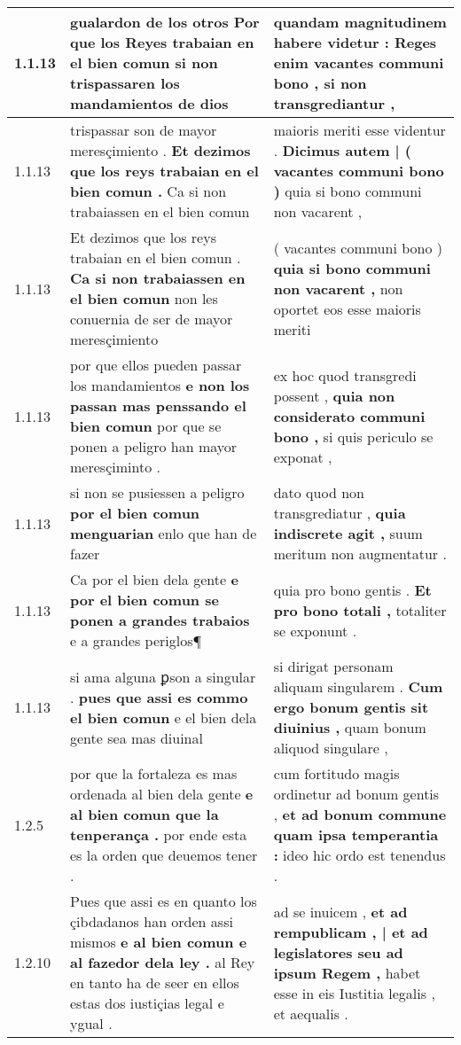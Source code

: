 \begin{tabular}{|p{1cm}|p{6.5cm}|p{6.5cm}|}
1.1.13 & gualardon de los otros \textbf{ Por que los Reyes trabaian en el bien comun } si non trispassaren los mandamientos de dios & quandam magnitudinem habere videtur : \textbf{ Reges enim vacantes communi bono , } si non transgrediantur , \\\hline
1.1.13 & trispassar son de mayor meresçimiento . \textbf{ Et dezimos que los reys trabaian en el bien comun . } Ca si non trabaiassen en el bien comun & maioris meriti esse videntur . \textbf{ Dicimus autem | ( vacantes communi bono ) } quia si bono communi non vacarent , \\\hline
1.1.13 & Et dezimos que los reys trabaian en el bien comun . \textbf{ Ca si non trabaiassen en el bien comun } non les conuernia de ser de mayor meresçimiento & ( vacantes communi bono ) \textbf{ quia si bono communi non vacarent , } non oportet eos esse maioris meriti \\\hline
1.1.13 & por que ellos pueden passar los mandamientos \textbf{ e non los passan mas penssando el bien comun } por que se ponen a peligro han mayor meresçiminto . & ex hoc quod transgredi possent , \textbf{ quia non considerato communi bono , } si quis periculo se exponat , \\\hline
1.1.13 & si non se pusiessen a peligro \textbf{ por el bien comun menguarian } enlo que han de fazer & dato quod non transgrediatur , \textbf{ quia indiscrete agit , } suum meritum non augmentatur . \\\hline
1.1.13 & Ca por el bien dela gente \textbf{ e por el bien comun se ponen a grandes trabaios } e a grandes periglos¶ & quia pro bono gentis . \textbf{ Et pro bono totali , } totaliter se exponunt . \\\hline
1.1.13 & si ama alguna ꝑson a singular . \textbf{ pues que assi es commo el bien comun } e el bien dela gente sea mas diuinal & si dirigat personam aliquam singularem . \textbf{ Cum ergo bonum gentis sit diuinius , } quam bonum aliquod singulare , \\\hline
1.2.5 & por que la fortaleza es mas ordenada al bien dela gente \textbf{ e al bien comun que la tenperança . } por ende esta es la orden que deuemos tener . & cum fortitudo magis ordinetur ad bonum gentis , \textbf{ et ad bonum commune quam ipsa temperantia : } ideo hic ordo est tenendus . \\\hline
1.2.10 & Pues que assi es en quanto los çibdadanos han orden assi mismos \textbf{ e al bien comun e al fazedor dela ley . } al Rey en tanto ha de seer en ellos estas dos iustiçias legal e ygual . & ad se inuicem , \textbf{ et ad rempublicam , | et ad legislatores seu ad ipsum Regem , } habet esse in eis Iustitia legalis , et aequalis . \\\hline

\end{tabular}
